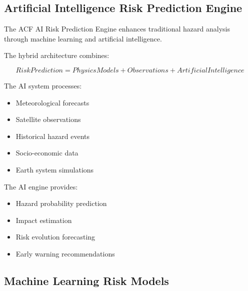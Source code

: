 \subsection{Artificial Intelligence Risk Prediction Engine}

The ACF AI Risk Prediction Engine enhances traditional hazard analysis
through machine learning and artificial intelligence.

The hybrid architecture combines:

\[
RiskPrediction
=
PhysicsModels
+
Observations
+
ArtificialIntelligence
\]


The AI system processes:

\begin{itemize}

\item Meteorological forecasts

\item Satellite observations

\item Historical hazard events

\item Socio-economic data

\item Earth system simulations

\end{itemize}


The AI engine provides:

\begin{itemize}

\item Hazard probability prediction

\item Impact estimation

\item Risk evolution forecasting

\item Early warning recommendations

\end{itemize}



\subsection{Machine Learning Risk Models}

